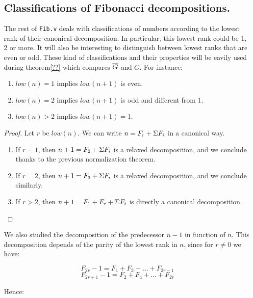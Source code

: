 \documentclass[a4paper,11pt]{article}
\begin{document}
\subsection{Classifications of Fibonacci decompositions.}
The rest of {\tt Fib.v} deals with classifications of numbers
according to the lowest rank of their canonical decomposition.
In particular, this lowest rank could be 1, 2 or more. It will
also be interesting to distinguish between lowest ranks that
are even or odd. These kind of classifications and their
properties will be eavily used
during theorem\ref{??} which compares $\overline{G}$ and $G$.
For instance:
\begin{theorem}\label{fibsucc}
\noindent
\begin{enumerate}
\item $low(n) = 1$ implies $low(n+1)$ is even.
\item $low(n) = 2$ implies $low(n+1)$ is odd and different from 1.
\item $low(n) > 2$ implies $low(n+1) = 1$.
\end{enumerate}
\end{theorem}
\begin{proof}
Let $r$ be $low(n)$. We can write $n = F_r + \Sigma F_i$ in a canonical
way.
\begin{enumerate}
\item If $r = 1$, then $n+1 = F_2 + \Sigma F_i$ is a relaxed decomposition,
  and we conclude thanks to the previous normalization theorem.
\item If $r = 2$, then $n+1 = F_3 + \Sigma F_i$ is a relaxed decomposition,
  and we conclude similarly.
\item If $r > 2$, then $n+1 = F_1 + F_r + \Sigma F_i$ is directly a
  canonical decomposition.
\end{enumerate}
\end{proof}

We also studied the decomposition of the predecessor
$n-1$ in function of $n$. This decomposition depends of the parity of
the lowest rank in $n$, since for $r\neq 0$ we have:

$$ F_{2r} - 1 = F_1 + F_3 + ... + F_{2r-1}$$
$$ F_{2r+1} - 1 = F_2 + F_4 + ... + F_{2r}$$

Hence:
\end{document}
